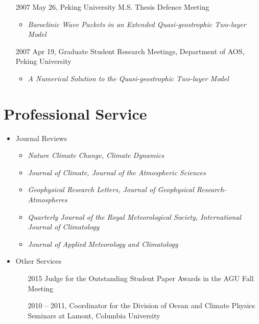 \documentclass[11pt]{article}
\newcommand{\meetingName}[1]{#1}
\newcommand{\ptitle}[1]{\textit{#1}}
\begin{document}
\begin{itemize}[leftmargin=10ex]
	\item [2007]May 26,  \meetingName{Peking University M.S. Thesis Defence Meeting}
	\begin{itemize}[leftmargin=4ex]
		\item \ptitle{Baroclinic Wave Packets in an Extended Quasi-geostrophic Two-layer Model}
		\end{itemize}
	
	\item [2007]Apr 19, \meetingName{Graduate Student Research Meetings, Department of AOS, Peking University}
	\begin{itemize}[leftmargin=4ex]
		\item \ptitle{A Numerical Solution to the Quasi-geostrophic Two-layer Model}
		\end{itemize}

\end{itemize}


\section{Professional Service} 
\begin{itemize}[leftmargin=4ex]
	\item Journal Reviews
    	\begin{itemize}[leftmargin=4ex]
	\item \textit{Nature Climate Change, Climate Dynamics}
    	\item \textit{Journal of Climate, Journal of the Atmospheric Sciences}
	\item \textit{Geophysical Research Letters, Journal of Geophysical Research-Atmospheres}
	\item \textit{Quarterly Journal of the Royal Meteorological Society, International Journal of Climatology}
	\item \textit{Journal of Applied Meteorology and Climatology}	
    	\end{itemize}
	
	\item Other Services
	\begin{itemize}[leftmargin=10ex]
		\item[2015] Judge for the Outstanding Student Paper Awards in the AGU Fall Meeting
		\item[2010]-- 2011, Coordinator for the Division of Ocean and Climate Physics Seminars at Lamont, Columbia University
	\end{itemize}
\end{itemize}
	
\end{document}
